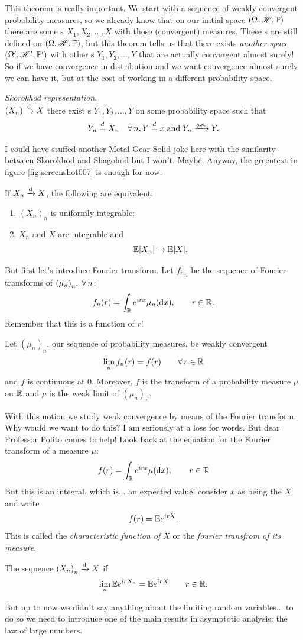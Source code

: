 \documentclass{report}
\begin{document}
This theorem is really important. We start with a sequence of weakly convergent probability measures, so we already know that on our initial space $(\Omega,\mathscr{H},\mathbb{P})$ there are some \rv s $X_1,X_2,\ldots,X$ with those (convergent) measures. These \rv s are still defined on $(\Omega,\mathscr{H},\mathbb{P})$, but this theorem tells us that there exists \textit{another space} $(\Omega',\mathscr{H}',\mathbb{P}')$ with other \rv s $Y_1,Y_2,\ldots,Y$ that are actually convergent almost surely! So if we have convergence in distribution and we want convergence almost surely we can have it, but at the cost of working in a different probability space.
\begin{corollary}
	\emph{Skorokhod representation}.\\
	$(X_n)\xrightarrow[]{\text{d}} X$ \ifonly{} there exist \rv s $Y_1,Y_2,\ldots,Y$ on some probability space such that 
	\[Y_n\stackrel{d}{=}X_n\quad\forall\, n, Y\stackrel{d}{=}x\;\text{and}\;Y_n\xrightarrow[]{\text{a.s.}} Y.\]
\end{corollary}
I could have stuffed another Metal Gear Solid joke here with the similarity between Skorokhod and Shagohod but I won't. Maybe. Anyway, the greentext in figure \ref*{fig:screenshot007} is enough for now. 
\begin{proposition}
	If $X_n\xrightarrow[]{\text{d}} X$, the following are equivalent:
	\begin{enumerate}[\circnum]
		\item ${(X_n)}_{n}$ is uniformly integrable;
		\item $X_n$ and $X$ are integrable and
		\[\mathbb{E}|X_n|\to\mathbb{E}|X|.\]
	\end{enumerate}
\end{proposition}
But first let's introduce Fourier transform. Let ${f_n}_{n}$ be the sequence of Fourier transforms of ${(\mu_{n})}_{n},\;\forall\, n$:
\[f_n(r)=\int_{\mathbb{R}}e^{irx}\mu_n(\mathop{}\!\mathrm{d} x),\qquad r\in\mathbb{R}.\]
Remember that this is a function of $r$!
\begin{theorem}
	Let ${(\mu_n)}_{n}$, our sequence of probability measures, be weakly convergent \ifonly{}
	\[\lim_n f_n(r)=f(r)\qquad\forall\, r\in\mathbb{R}\]
	and $f$ is continuous at 0. Moreover, $f$ is the transform of a probability measure $\mu$ on $\mathbb{R}$ and $\mu$ is the weak limit of ${(\mu_n)}_{n}$.
\end{theorem}
With this notion we study weak convergence by means of the Fourier transform. Why would we want to do this? I am seriously at a loss for words. But dear Professor Polito comes to help! Look back at the equation for the Fourier transform of a measure $\mu$:
\[f(r)=\int_{\mathbb{R}}e^{irx}\mu(\mathop{}\!\mathrm{d} x),\qquad r\in\mathbb{R}\]
But this is an integral, which is... an expected value! consider $x$ as being the \rv{} $X$ and write
\[f(r)=\mathbb{E} e^{irX}.\]
This is called the \emph{characteristic function of $X$} or the \emph{fourier transfrom of its measure}.
\begin{corollary}
	The sequence ${(X_n)}_{n}\xrightarrow[]{\text{d}} X$ if
	\[\lim_n\mathbb{E} e^{irX_{n}}=\mathbb{E} e^{irX}\qquad r\in\mathbb{R}.\] 
\end{corollary}
But up to now we didn't say anything about the limiting random variables... to do so we need to introduce one of the main results in asymptotic analysis: the law of large numbers.
\end{document}
